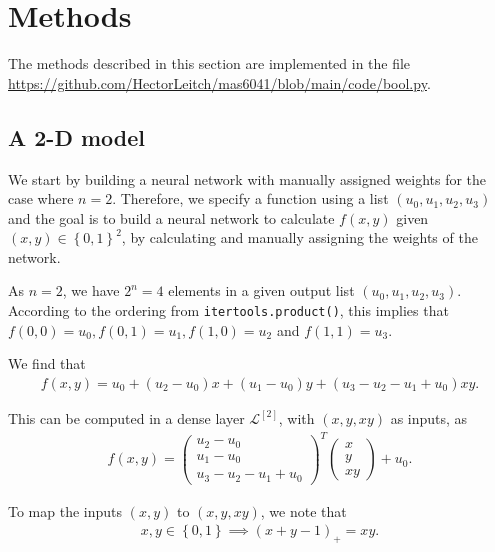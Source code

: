 \documentclass{somasmsc}
\begin{document}
\section{Methods}

The methods described in this section are implemented in the file \url{https://github.com/HectorLeitch/mas6041/blob/main/code/bool.py}.

\subsection{A 2-D model}\label{bool:2d}

We start by building a neural network with manually assigned weights for the case where $n=2$. Therefore, we specify a function using a list $\left(u_0, u_1, u_2, u_3\right)$ and the goal is to build a neural network to calculate $f\left(x, y\right)$ given $\left(x, y\right) \in \left\{0, 1\right\}^2$, by calculating and manually assigning the weights of the network.

As $n=2$, we have $2^n = 4$ elements in a given output list $\left(u_0, u_1, u_2, u_3\right)$. According to the ordering from \verb|itertools.product()|, this implies that $f\left(0, 0\right) = u_0, f\left(0, 1\right) = u_1, f\left(1, 0\right) = u_2$ and $f\left(1, 1\right) = u_3$.

We find that
\begin{align} \label{bool:eq1}
f\left(x, y\right) = u_0 + \left(u_2 - u_0\right)x + \left(u_1 - u_0\right)y + \left(u_3 - u_2 - u_1 + u_0\right)xy. 
\end{align}

This can be computed in a dense layer $\mathcal{L}^{\left[2\right]}$, with $\left(x, y, xy\right)$ as inputs, as
\begin{align} \label{bool:eq2}
f\left(x, y\right) =
\begin{pmatrix}
    u_2 - u_0 \\
    u_1 - u_0 \\
    u_3 - u_2 - u_1 + u_0
\end{pmatrix}^T
\begin{pmatrix}
    x \\
    y\\
    xy
\end{pmatrix}
+ u_0.
\end{align}

To map the inputs $\left(x, y\right)$ to $\left(x, y, xy\right)$, we note that
\begin{align} \label{bool:eq3}
x, y \in \left\{0, 1\right\} \implies \left(x + y - 1\right)_+ = xy.
\end{align}
\end{document}
